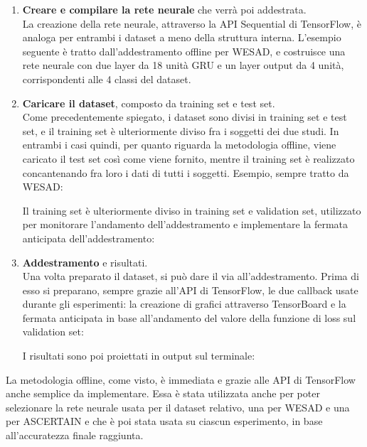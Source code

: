 \begin{enumerate}
    \item \textbf{Creare e compilare la rete neurale} che verrà poi addestrata.\\
    La creazione della rete neurale, attraverso la API Sequential di TensorFlow, è analoga per entrambi i dataset a meno della struttura interna. L'esempio seguente è tratto dall'addestramento offline per WESAD, e costruisce una rete neurale con due layer da 18 unità GRU e un layer output da 4 unità, corrispondenti alle 4 classi del dataset.
    
    \item \textbf{Caricare il dataset}, composto da training set e test set.\\
    Come precedentemente spiegato, i dataset sono divisi in training set e test set, e il training set è ulteriormente diviso fra i soggetti dei due studi. In entrambi i casi quindi, per quanto riguarda la metodologia offline, viene caricato il test set così come viene fornito, mentre il training set è realizzato concantenando fra loro i dati di tutti i soggetti. Esempio, sempre tratto da WESAD:
    
    
    Il training set è ulteriormente diviso in training set e validation set, utilizzato per monitorare l'andamento dell'addestramento e implementare la fermata anticipata dell'addestramento:
    
    \item \textbf{Addestramento} e risultati.\\
    Una volta preparato il dataset, si può dare il via all'addestramento. Prima di esso si preparano, sempre grazie all'API di TensorFlow, le due callback usate durante gli esperimenti: la creazione di grafici attraverso TensorBoard e la fermata anticipata in base all'andamento del valore della funzione di loss sul validation set:
    
    I risultati sono poi proiettati in output sul terminale:
    
\end{enumerate}
La metodologia offline, come visto, è immediata e grazie alle API di TensorFlow anche semplice da implementare. Essa è stata utilizzata anche per poter selezionare la rete neurale usata per il dataset relativo, una per WESAD e una per ASCERTAIN e che è poi stata usata su ciascun esperimento, in base all'accuratezza finale raggiunta.

